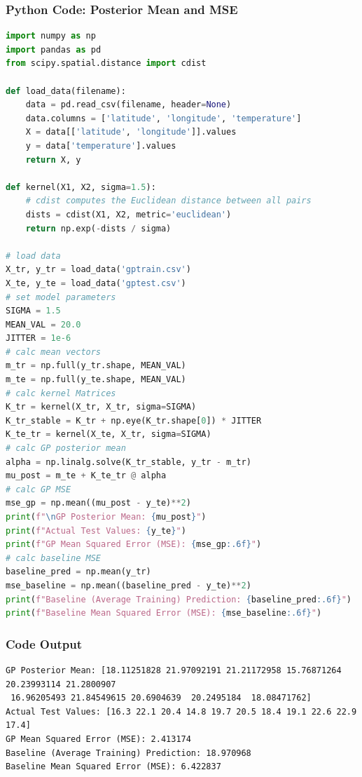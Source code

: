 \documentclass{article}
\begin{document}
\subsubsection*{Python Code: Posterior Mean and MSE}
\begin{lstlisting}[language=Python]
import numpy as np
import pandas as pd
from scipy.spatial.distance import cdist

def load_data(filename):
    data = pd.read_csv(filename, header=None)
    data.columns = ['latitude', 'longitude', 'temperature']
    X = data[['latitude', 'longitude']].values
    y = data['temperature'].values
    return X, y

def kernel(X1, X2, sigma=1.5):
    # cdist computes the Euclidean distance between all pairs
    dists = cdist(X1, X2, metric='euclidean')
    return np.exp(-dists / sigma)

# load data
X_tr, y_tr = load_data('gptrain.csv')
X_te, y_te = load_data('gptest.csv')
# set model parameters
SIGMA = 1.5
MEAN_VAL = 20.0
JITTER = 1e-6 
# calc mean vectors 
m_tr = np.full(y_tr.shape, MEAN_VAL)
m_te = np.full(y_te.shape, MEAN_VAL)
# calc kernel Matrices 
K_tr = kernel(X_tr, X_tr, sigma=SIGMA)
K_tr_stable = K_tr + np.eye(K_tr.shape[0]) * JITTER
K_te_tr = kernel(X_te, X_tr, sigma=SIGMA)
# calc GP posterior mean
alpha = np.linalg.solve(K_tr_stable, y_tr - m_tr)
mu_post = m_te + K_te_tr @ alpha
# calc GP MSE 
mse_gp = np.mean((mu_post - y_te)**2)
print(f"\nGP Posterior Mean: {mu_post}")
print(f"Actual Test Values: {y_te}")
print(f"GP Mean Squared Error (MSE): {mse_gp:.6f}")
# calc baseline MSE
baseline_pred = np.mean(y_tr)
mse_baseline = np.mean((baseline_pred - y_te)**2)
print(f"Baseline (Average Training) Prediction: {baseline_pred:.6f}")
print(f"Baseline Mean Squared Error (MSE): {mse_baseline:.6f}")
\end{lstlisting}

\subsubsection*{Code Output}
\begin{verbatim}
GP Posterior Mean: [18.11251828 21.97092191 21.21172958 15.76871264 20.23993114 21.2800907
 16.96205493 21.84549615 20.6904639  20.2495184  18.08471762]
Actual Test Values: [16.3 22.1 20.4 14.8 19.7 20.5 18.4 19.1 22.6 22.9 17.4]
GP Mean Squared Error (MSE): 2.413174
Baseline (Average Training) Prediction: 18.970968
Baseline Mean Squared Error (MSE): 6.422837
\end{verbatim}
\end{document}
